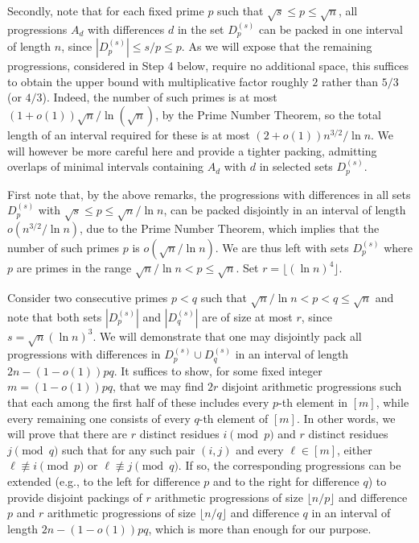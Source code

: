 \documentclass[12pt]{amsart}
\theoremstyle{plain}
\numberwithin{equation}{section}
\begin{document}
	Secondly, note that for each fixed prime $p$ such that $\sqrt s\leqslant p \leqslant \sqrt n$, all progressions $A_d$ with differences $d$ in the set $D_p^{(s)}$ can be packed in one interval of length $n$, since $|D_p^{(s)}| \leqslant s/p \leqslant p$. As we will expose that the remaining progressions, considered in Step 4 below, require no additional space, this suffices to obtain the upper bound with multiplicative factor roughly $2$ rather than $5/3$ (or $4/3$). Indeed, the number of such primes is at most $(1+o(1)) \sqrt n/ \ln (\sqrt n)$, by the Prime Number Theorem, so the total length of an interval required for these is at most $(2+o(1))n^{3/2}/ \ln n$. 
	We will however be more careful here and provide a tighter packing, admitting overlaps of minimal intervals containing $A_d$ with $d$ in selected sets $D_p^{(s)}$.

	
	First note that, by the above remarks, the progressions with differences in all sets $D_p^{(s)}$ with $\sqrt s\leqslant p \leqslant \sqrt n/\ln n$, can be packed disjointly in an interval of length $o(n^{3/2}/\ln n)$, due to the Prime Number Theorem, which implies that the number of such primes $p$ is $o(\sqrt{n}/\ln n)$. We are thus left with sets $D_p^{(s)}$ where $p$ are primes in the range $\sqrt n/\ln n < p \leqslant \sqrt n$. Set $r=\lfloor(\ln n)^4\rfloor$.
	
	Consider two consecutive primes $p<q$ such that $\sqrt n/\ln n< p<q \leqslant \sqrt n$ and note that both sets $|D_p^{(s)}|$ and $|D_q^{(s)}|$ are of size at most $r$, since $s=\sqrt n (\ln n)^3$. We will demonstrate that one may disjointly pack all progressions with differences in $D_p^{(s)}\cup D_q^{(s)}$ in an interval of length $2n-(1-o(1))pq$. It suffices to show, for some fixed integer $m=(1-o(1))pq$, that we may find $2r$ disjoint arithmetic progressions such that each among the first half of these includes every $p$-th element in $[m]$, while every remaining one consists of every $q$-th element of $[m]$. In other words, we will prove that there are $r$ distinct residues $i\pmod p$ and $r$ distinct residues $j \pmod q$ such that for any such pair $(i,j)$ and every $\ell\in [m]$, either $\ell\not\equiv i\pmod p$ or $\ell\not\equiv j\pmod q$. If so, the corresponding progressions can be extended (e.g., to the left for difference $p$ and to the right for difference $q$) to provide disjoint packings of $r$ arithmetic progressions of size $\lfloor n/p\rfloor$ and difference $p$ and $r$ arithmetic progressions of size $\lfloor n/q\rfloor$ and difference $q$ in an interval of length $2n-(1-o(1))pq$,
	which is more than enough for our purpose.
	
\end{document}
